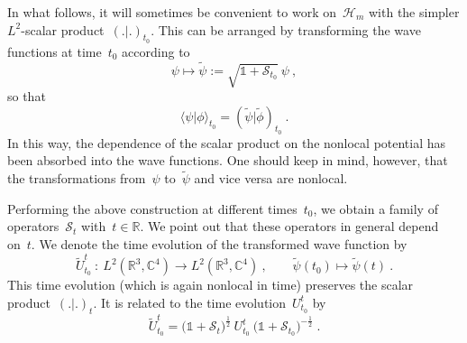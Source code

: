 \documentclass[reqno,11pt]{amsart}
\numberwithin{equation}{section}
\newcommand{\beq}{\begin{equation}}
\newcommand{\eeq}{\end{equation}}
\newcommand{\la}{\langle}
\newcommand{\ra}{\rangle}
\newcommand{\C}{\mathbb{C}}
\newcommand{\R}{\mathbb{R}}
\newcommand{\1}{\mathds{1}}
\renewcommand{\H}{\mathscr{H}}
\newcommand{\Sig}{\mathscr{S}}
\begin{document}
In what follows, it will sometimes be convenient to work on~$\H_m$ with the
simpler $L^2$-scalar product~$( .|. )_{t_0}$. This can be arranged by transforming the wave functions
at time~${t_0}$ according to
\beq \label{tildepsi}
\psi \mapsto \tilde{\psi} := \sqrt{\1+\Sig_{t_0}} \:\psi \:,
\eeq
so that
\[ \la \psi | \phi \ra_{t_0} = ( \tilde{\psi} | \tilde{\phi})_{t_0} \:. \]
In this way, the dependence of the scalar product on the nonlocal potential has been absorbed
into the wave functions. One should keep in mind, however, that the transformations from~$\psi$ to~$\tilde{\psi}$
and vice versa are nonlocal.


Performing the above construction at different times~$t_0$, we obtain a family of operators~$\Sig_t$
with~$t \in \R$. We point out that these operators in general depend on~$t$.
We denote the time evolution of the transformed wave function by
\[ %
\tilde{U}^t_{t_0} \::\: L^2(\R^3, \C^4) \rightarrow L^2(\R^3, \C^4)\:,\qquad
\tilde{\psi}(t_0) \mapsto \tilde{\psi}(t) \:. \]
This time evolution (which is again nonlocal in time) preserves the scalar product~$(.|.)_t$.
It is related to the time evolution~$U^t_{t_0}$ by
\[ \tilde{U}^t_{t_0} = \big( \1+\Sig_t \big)^\frac{1}{2}\: U^t_{t_0}\: \big( \1+\Sig_{t_0} \big)^{-\frac{1}{2}}\;. \]
\end{document}

